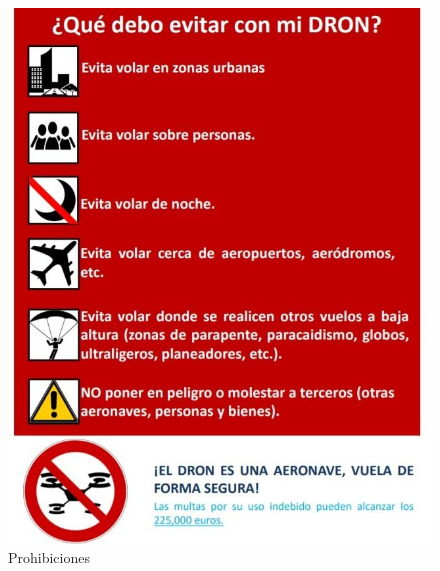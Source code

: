 \begin{figure}[H]
  \centering
  \includegraphics[scale=0.3]{imagenes/prohibiciones.jpg}
  \caption{Prohibiciones}
  \label{fig:prohibiciones}
\end{figure}


